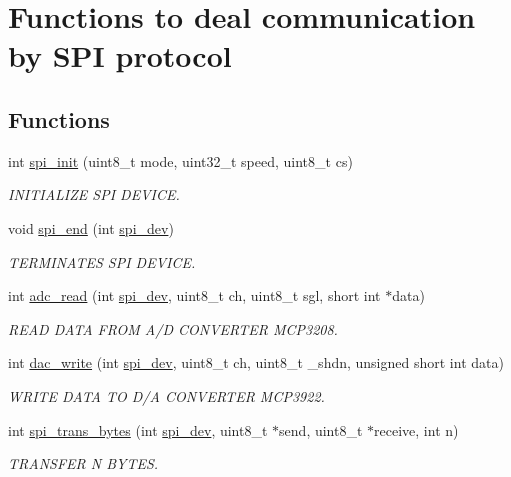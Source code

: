 \hypertarget{group__spi}{\section{Functions to deal communication by S\-P\-I protocol}
\label{group__spi}
}
\subsection*{Functions}
\begin{DoxyCompactItemize}
\item 
int \hyperlink{group__spi_ga70764aca888e93b0329e7a62c9312704}{spi\-\_\-init} (uint8\-\_\-t mode, uint32\-\_\-t speed, uint8\-\_\-t cs)
\begin{DoxyCompactList}\small\item\em I\-N\-I\-T\-I\-A\-L\-I\-Z\-E S\-P\-I D\-E\-V\-I\-C\-E. \end{DoxyCompactList}\item 
void \hyperlink{group__spi_ga3fb02c6fc5990df81645306a81291624}{spi\-\_\-end} (int \hyperlink{CommunicationV0_2communication_8c_a4788f0a5355494bc6c13690e28f43783}{spi\-\_\-dev})
\begin{DoxyCompactList}\small\item\em T\-E\-R\-M\-I\-N\-A\-T\-E\-S S\-P\-I D\-E\-V\-I\-C\-E. \end{DoxyCompactList}\item 
int \hyperlink{group__spi_gae385345c227d9f67ab490b94ed628988}{adc\-\_\-read} (int \hyperlink{CommunicationV0_2communication_8c_a4788f0a5355494bc6c13690e28f43783}{spi\-\_\-dev}, uint8\-\_\-t ch, uint8\-\_\-t sgl, short int $\ast$data)
\begin{DoxyCompactList}\small\item\em R\-E\-A\-D D\-A\-T\-A F\-R\-O\-M A/\-D C\-O\-N\-V\-E\-R\-T\-E\-R M\-C\-P3208. \end{DoxyCompactList}\item 
int \hyperlink{group__spi_ga5c52e64c336d59215ce0a4b6f340dc9f}{dac\-\_\-write} (int \hyperlink{CommunicationV0_2communication_8c_a4788f0a5355494bc6c13690e28f43783}{spi\-\_\-dev}, uint8\-\_\-t ch, uint8\-\_\-t \-\_\-shdn, unsigned short int data)
\begin{DoxyCompactList}\small\item\em W\-R\-I\-T\-E D\-A\-T\-A T\-O D/\-A C\-O\-N\-V\-E\-R\-T\-E\-R M\-C\-P3922. \end{DoxyCompactList}\item 
int \hyperlink{group__spi_ga3ae450d2b3ece27bb6036f811a7625a9}{spi\-\_\-trans\-\_\-bytes} (int \hyperlink{CommunicationV0_2communication_8c_a4788f0a5355494bc6c13690e28f43783}{spi\-\_\-dev}, uint8\-\_\-t $\ast$send, uint8\-\_\-t $\ast$receive, int n)
\begin{DoxyCompactList}\small\item\em T\-R\-A\-N\-S\-F\-E\-R N B\-Y\-T\-E\-S. \end{DoxyCompactList}\end{DoxyCompactItemize}


